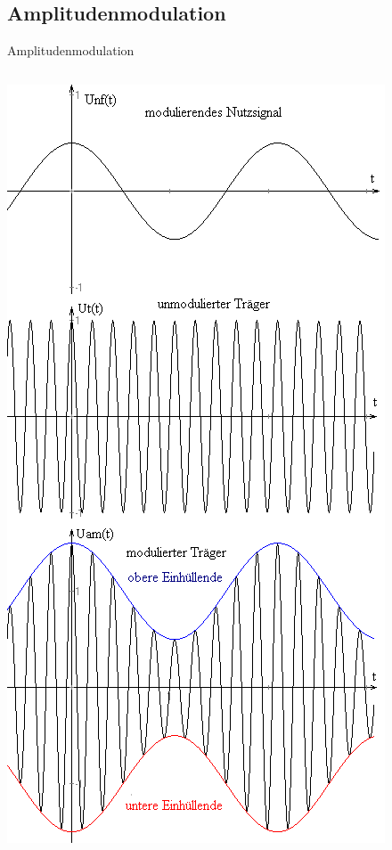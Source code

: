 \subsection[AM]{Amplitudenmodulation}

\begin{frame}{Amplitudenmodulation}
  \begin{columns}[c]
    \includegraphics[width=\textwidth,height=.85\textheight,keepaspectratio]{e14/AM1.png}\\

\end{columns}
\end{frame}
